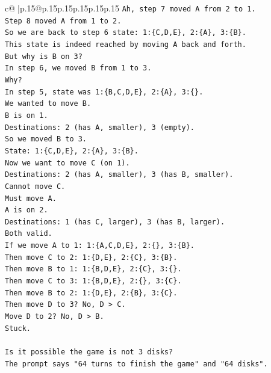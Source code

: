 \documentclass{article}
\begin{document}
{\begin{supertabular}{c@{$\;$}|p{.15\linewidth}@{}p{.15\linewidth}p{.15\linewidth}p{.15\linewidth}p{.15\linewidth}p{.15\linewidth}}
{{{\texttt{Ah, step 7 moved A from 2 to 1.} \\
\texttt{Step 8 moved A from 1 to 2.} \\
\texttt{So we are back to step 6 state: 1:\{C,D,E\}, 2:\{A\}, 3:\{B\}.} \\
\texttt{This state is indeed reached by moving A back and forth.} \\
\texttt{But why is B on 3?} \\
\texttt{In step 6, we moved B from 1 to 3.} \\
\texttt{Why?} \\
\texttt{In step 5, state was 1:\{B,C,D,E\}, 2:\{A\}, 3:\{\}.} \\
\texttt{We wanted to move B.} \\
\texttt{B is on 1.} \\
\texttt{Destinations: 2 (has A, smaller), 3 (empty).} \\
\texttt{So we moved B to 3.} \\
\texttt{State: 1:\{C,D,E\}, 2:\{A\}, 3:\{B\}.} \\
\texttt{Now we want to move C (on 1).} \\
\texttt{Destinations: 2 (has A, smaller), 3 (has B, smaller).} \\
\texttt{Cannot move C.} \\
\texttt{Must move A.} \\
\texttt{A is on 2.} \\
\texttt{Destinations: 1 (has C, larger), 3 (has B, larger).} \\
\texttt{Both valid.} \\
\texttt{If we move A to 1: 1:\{A,C,D,E\}, 2:\{\}, 3:\{B\}.} \\
\texttt{Then move C to 2: 1:\{D,E\}, 2:\{C\}, 3:\{B\}.} \\
\texttt{Then move B to 1: 1:\{B,D,E\}, 2:\{C\}, 3:\{\}.} \\
\texttt{Then move C to 3: 1:\{B,D,E\}, 2:\{\}, 3:\{C\}.} \\
\texttt{Then move B to 2: 1:\{D,E\}, 2:\{B\}, 3:\{C\}.} \\
\texttt{Then move D to 3? No, D > C.} \\
\texttt{Move D to 2? No, D > B.} \\
\texttt{Stuck.} \\
\\ 
\texttt{Is it possible the game is not 3 disks?} \\
\texttt{The prompt says "64 turns to finish the game" and "64 disks".} \\
}}}
\end{supertabular}}
\end{document}

